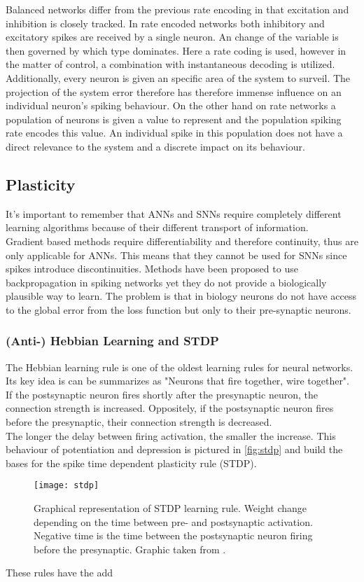 Balanced networks differ from the previous rate encoding in that excitation and inhibition is closely tracked. In rate encoded networks both inhibitory and excitatory spikes are received by a single neuron. An change of the variable is then governed by which type dominates. Here a rate coding is used, however in the matter of control, a combination with instantaneous decoding is \cite{johnson_minimum-error_2016} utilized.\\
Additionally, every neuron is given an specific area of the system to surveil. The projection of the system error therefore has therefore immense influence on an individual neuron's spiking behaviour. On the other hand on rate networks a population of neurons is given a value to represent and the population spiking rate encodes this value. An individual spike in this population does not have a direct relevance to the system and a discrete impact on its behaviour.\\



\subsection{Plasticity}
It's important to remember that \acp{ANN} and \acp{SNN} require completely different learning algorithms because of their different transport of information.\\
Gradient based methods require differentiability and therefore continuity, thus are only applicable for \acp{ANN}. This means that they cannot be used for \acp{SNN} since spikes introduce discontinuities. Methods have been proposed to use backpropagation in spiking networks\cite{lee_training_2016} yet they do not provide a biologically plausible way to learn. The problem is that in biology neurons do not have access to the global error from the loss function but only to their pre-synaptic neurons.
\subsubsection{(Anti-) Hebbian Learning and STDP}
The Hebbian learning rule is one of the oldest learning rules for neural networks. Its key idea is can be summarizes as "Neurons that fire together, wire together". If the postsynaptic neuron fires shortly after the presynaptic neuron, the connection strength is increased. Oppositely, if the postsynaptic neuron fires before the presynaptic, their connection strength is decreased.\\
The longer the delay between firing activation, the smaller the increase. This behaviour of potentiation and depression is pictured in \cref{fig:stdp} and build the bases for the spike time dependent plasticity rule (STDP).
\begin{figure}
	\centering
	\texttt{[image: stdp]}
	\caption{Graphical representation of STDP learning rule. Weight change depending on the time between pre- and postsynaptic activation. Negative time is the time between the postsynaptic neuron firing before the presynaptic. Graphic taken from \cite{yi_learning_2023}.}
\end{figure}

These rules have the add



